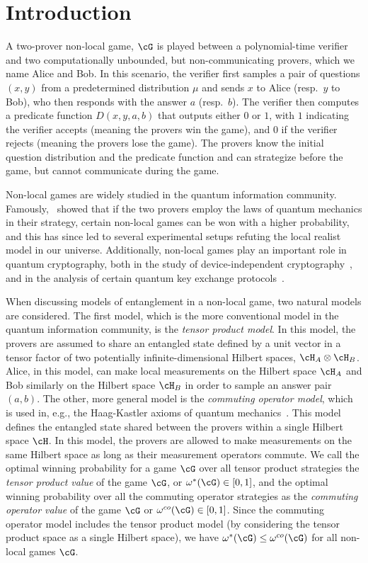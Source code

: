 
\section{Introduction}


A two-prover non-local game, $\cG$ is played between a polynomial-time verifier and two computationally unbounded, but non-communicating provers, which we name Alice and Bob. In this scenario, the verifier first samples a pair of questions $(x,y)$ from a predetermined distribution $\mu$ and sends $x$ to Alice (resp.~$y$ to Bob), who then responds with the answer $a$  (resp.~$b$). The verifier then computes a predicate function $D(x,y,a,b)$ that outputs either $0$ or $1$, with $1$ indicating the verifier accepts (meaning the provers win the game), and $0$ if the verifier rejects (meaning the provers lose the game). The provers know the initial question distribution and the predicate function and can strategize before the game, but cannot communicate during the game.

Non-local games are widely studied in the quantum information community. Famously,~\cite{bellEinsteinPodolskyRosen1964a} showed that if the two provers employ the laws of quantum mechanics in their strategy, certain non-local games can be won with a higher probability, and this has since led to several experimental setups refuting the local realist model in our universe. Additionally, non-local games play an important role in quantum cryptography, both in the study of device-independent cryptography~\cite{bowlesSelftestingPauliObservables2018,jainParallelDeviceIndependentQuantum2020}, and in the analysis of certain quantum key exchange protocols~\cite{ekertQuantumCryptographyBased1991}. 

When discussing models of entanglement in a non-local game, two natural models are considered. The first model, which is the more conventional model in the quantum information community, is the \textit{tensor product model}. In this model, the provers are assumed to share an entangled state defined by a unit vector in a tensor factor of two potentially infinite-dimensional Hilbert spaces, $\cH_A \otimes \cH_B$. Alice, in this model, can make local measurements on the Hilbert space $\cH_A$ and Bob similarly on the Hilbert space $\cH_B$ in order to sample an answer pair $(a,b)$. The other, more general model is the \textit{commuting operator model}, which is used in, e.g., the Haag-Kastler axioms of quantum mechanics~\cite{haagAlgebraicApproachQuantum1964}. This model defines the entangled state shared between the provers within a single Hilbert space $\cH$. In this model, the provers are allowed to make measurements on the same Hilbert space as long as their measurement operators commute. We call the optimal winning probability for a game $\cG$ over all tensor product strategies the \textit{tensor product value} of the game $\cG$, or $\omega^*(\cG) \in [0,1]$, and the optimal winning probability over all the commuting operator strategies as the \textit{commuting operator value} of the game $\cG$ or $\omega^{co}(\cG)\in [0,1]$. Since the commuting operator model includes the tensor product model (by considering the tensor product space as a single Hilbert space), we have $\omega^*(\cG) \leq \omega^{co}(\cG)$ for all non-local games $\cG$. 

